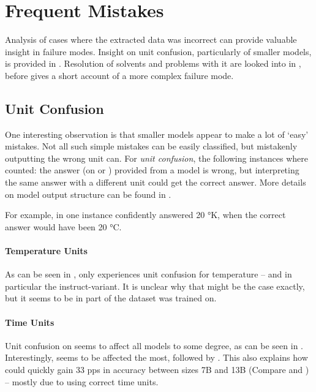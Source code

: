 \section{Frequent Mistakes}\label{sec:mistakes}
Analysis of cases where the extracted data was incorrect can provide valuable insight in failure modes.
Insight on unit confusion, particularly of smaller models, is provided in .
Resolution of solvents and problems with it are looked into in , before  gives a short account of a more complex failure mode.

\subsection{Unit Confusion}\label{sub:unitconfusion}




One interesting observation is that smaller models appear to make a lot of `easy' mistakes.
Not all such simple mistakes can be easily classified, but mistakenly outputting the wrong unit can.
For \textit{unit confusion}, the following instances where counted: the answer (on \ttemp or \ttime) provided from a model is wrong, but interpreting the same answer with a different unit could get the correct answer.
More details on model output structure can be found in .

For example, in one instance  confidently answered 20 °K, when the correct answer would have been 20 °C.

\paragraph{Temperature Units}
As can be seen in , only  experiences unit confusion for temperature -- and in particular the instruct-variant.
It is unclear why that might be the case exactly, but it seems to be in part of the dataset  was trained on.

\paragraph{Time Units}
Unit confusion on \ttime seems to affect all models to some degree, as can be seen in .
Interestingly,  seems to be affected the most, followed by .
This also explains how  could quickly gain 33 \glspl{pp} in accuracy between sizes 7B and 13B (Compare  and ) -- mostly due to using correct time units.

